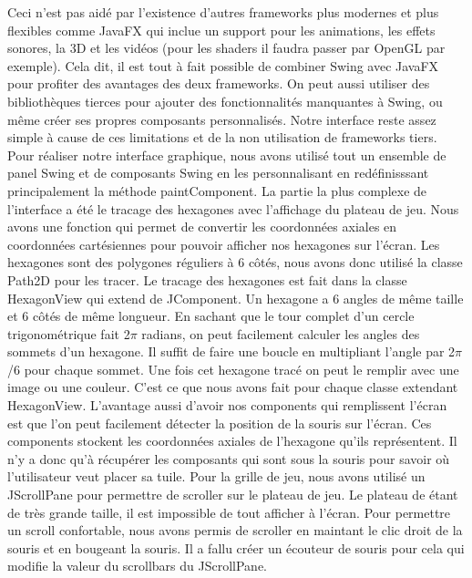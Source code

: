 \documentclass{article}
\begin{document}
    Ceci n'est pas aidé par l'existence d'autres frameworks plus modernes et plus flexibles comme JavaFX qui inclue un support pour les animations, les effets sonores, la 3D et les vidéos (pour les shaders il faudra passer par OpenGL par exemple).
    Cela dit, il est tout à fait possible de combiner Swing avec JavaFX pour profiter des avantages des deux frameworks.
    On peut aussi utiliser des bibliothèques tierces pour ajouter des fonctionnalités manquantes à Swing, ou même créer ses propres composants personnalisés.
    Notre interface reste assez simple à cause de ces limitations et de la non utilisation de frameworks tiers.
    \newline
    Pour réaliser notre interface graphique, nous avons utilisé tout un ensemble de panel Swing et de composants Swing en les personnalisant en redéfinisssant principalement la méthode paintComponent.
    La partie la plus complexe de l'interface a été le tracage des hexagones avec l'affichage du plateau de jeu.
    Nous avons une fonction qui permet de convertir les coordonnées axiales en coordonnées cartésiennes pour pouvoir afficher nos hexagones sur l'écran.
    Les hexagones sont des polygones réguliers à 6 côtés, nous avons donc utilisé la classe Path2D pour les tracer.
    Le tracage des hexagones est fait dans la classe HexagonView qui extend de JComponent.
    Un hexagone a 6 angles de même taille et 6 côtés de même longueur.
    En sachant que le tour complet d'un cercle trigonométrique fait 2$\pi$ radians, on peut facilement calculer les angles des sommets d'un hexagone.
    Il suffit de faire une boucle en multipliant l'angle par 2$\pi$/6 pour chaque sommet.
    Une fois cet hexagone tracé on peut le remplir avec une image ou une couleur. C'est ce que nous avons fait pour chaque classe extendant HexagonView.
    L'avantage aussi d'avoir nos components qui remplissent l'écran est que l'on peut facilement détecter la position de la souris sur l'écran.
    Ces components stockent les coordonnées axiales de l'hexagone qu'ils représentent.
    Il n'y a donc qu'à récupérer les composants qui sont sous la souris pour savoir où l'utilisateur veut placer sa tuile.
    \newline
    Pour la grille de jeu, nous avons utilisé un JScrollPane pour permettre de scroller sur le plateau de jeu.
    Le plateau de étant de très grande taille, il est impossible de tout afficher à l'écran.
    Pour permettre un scroll confortable, nous avons permis de scroller en maintant le clic droit de la souris et en bougeant la souris.
    Il a fallu créer un écouteur de souris pour cela qui modifie la valeur du scrollbars du JScrollPane. 
\end{document}
